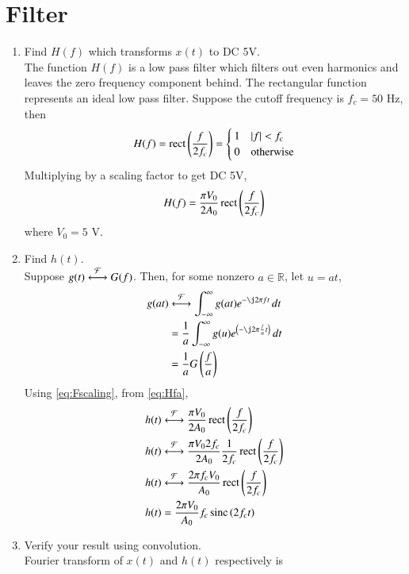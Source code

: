 \documentclass[journal,12pt,twocolumn]{IEEEtran}
\renewcommand\thesection{\arabic{section}}
\begin{document}
\section{Filter}
\begin{enumerate}[label=\thesection.\arabic*
	,ref=\thesection.\theenumi]
	\item Find $H(f)$ which transforms $x(t)$ to DC 5V.\\
	\solution The function $H(f)$ is a low pass filter which filters out
	even harmonics and leaves the zero frequency component behind.
	The rectangular function represents an ideal low pass filter. 
	Suppose the cutoff frequency is $f_c = 50$ Hz, then
	\begin{align}
		H(f) = \mathop{\mathrm{rect}}\left(\frac{f}{2f_c}\right) =
		\begin{cases}
			1 & \left\vert f\right\vert < f_c \\
			0 & \textrm{otherwise}
		\end{cases}
		\label{eq:Hfb}
	\end{align}
	Multiplying by a scaling factor to get DC 5V,
	\begin{align}
		\label{eq:Hfa}
		H(f) = \frac{\pi V_0}{2A_0}\mathop{\mathrm{rect}}{\left(\frac{f}{2f_c}\right)}
	\end{align}
	where $V_0 = 5$ V.
	\item Find $h(t)$.\\
	\solution Suppose $g(t)\overset{\mathcal{F}}{ \longleftrightarrow}G(f)$. Then, for some
	nonzero $a \in \mathbb{R}$, let $u=at$,
	\begin{align}
		g(at)&\system{F}\int_{-\infty}^{\infty}g(at)e^{-\j2\pi ft}\, dt \\
		&=\frac{1}{a}\int_{-\infty}^{\infty}g(u)e^{\brak{-\j2\pi \frac{f}{a}t}}\, dt \\
		\label{eq:Fscaling}
		&=\frac{1}{a}G\brak{\frac{f}{a}}
	\end{align}
Using \eqref{eq:Fscaling}, from \eqref{eq:Hfa},
\begin{align}
	h(t)&\overset{\mathcal{F}}{ \longleftrightarrow} \frac{\pi V_0}{2A_0}\mathop{\mathrm{rect}}{\left(\frac{f}{2f_c}\right)}\\
	h(t)&\overset{\mathcal{F}}{ \longleftrightarrow} \frac{\pi V_0 2f_c}{2A_0}  \frac{1}{2f_c}\mathop{\mathrm{rect}}{\left(\frac{f}{2f_c}\right)}\\
	h(t)&\overset{\mathcal{F}}{ \longleftrightarrow} \frac{2 \pi f_c V_0}{A_0}\mathop{\mathrm{rect}}{\left(\frac{f}{2f_c}\right)}\\
	h(t) &= \frac{2\pi V_0}{A_0}f_c\mathop{\mathrm{sinc}}\left(2f_ct\right)
	\end{align}
	\item Verify your result using convolution.\\
	\solution 
	Fourier transform of $x(t)$ and $h(t)$ respectively is

\end{enumerate}
\end{document}
